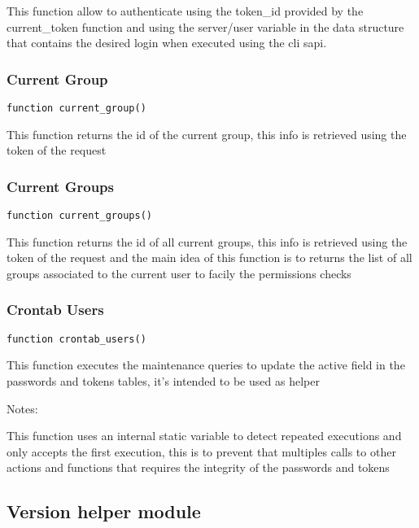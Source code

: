 \documentclass[a4paper]{article}
\begin{document}
This function allow to authenticate using the token\_id provided by the
current\_token function and using the server/user variable in the data
structure that contains the desired login when executed using the cli
sapi.

\hypertarget{toc264}{}
\subsubsection{Current Group}

\begin{lstlisting}
function current_group()
\end{lstlisting}

This function returns the id of the current group, this info is retrieved
using the token of the request

\hypertarget{toc265}{}
\subsubsection{Current Groups}

\begin{lstlisting}
function current_groups()
\end{lstlisting}

This function returns the id of all current groups, this info is retrieved
using the token of the request and the main idea of this function is to
returns the list of all groups associated to the current user to facily the
permissions checks

\hypertarget{toc266}{}
\subsubsection{Crontab Users}

\begin{lstlisting}
function crontab_users()
\end{lstlisting}

This function executes the maintenance queries to update the active field
in the passwords and tokens tables, it's intended to be used as helper

Notes:

This function uses an internal static variable to detect repeated executions
and only accepts the first execution, this is to prevent that multiples calls
to other actions and functions that requires the integrity of the passwords
and tokens

\hypertarget{toc267}{}
\subsection{Version helper module}
\end{document}
